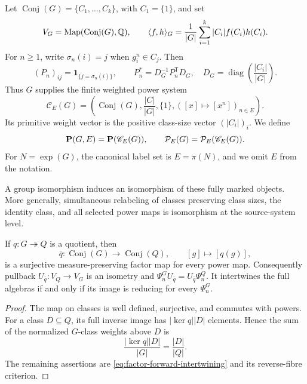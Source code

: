 Let
\(\operatorname{Conj}(G)=\{C_1,\ldots,C_k\}\), with
\(C_1=\{1\}\), and set
\begin{equation}
 V_G=\operatorname{Map}(\operatorname{Conj}(G),\mathbb Q),\qquad
 \langle f,h\rangle_G
 =\frac1{|G|}\sum_{i=1}^k |C_i|f(C_i)h(C_i).
 \label{eq:coordinate-class-form}
\end{equation}
For \(n\geq1\), write \(\sigma_n(i)=j\) when \(g_i^n\in C_j\).
Then
\begin{equation}
 (P_n)_{ij}=\mathbf1_{\{j=\sigma_n(i)\}},
 \qquad
 P_n^*=D_G^{-1}P_n^{\mathsf T}D_G,\quad
 D_G=\operatorname{diag}\left(\frac{|C_i|}{|G|}\right).
 \label{eq:power-matrix}
\end{equation}
Thus \(G\) supplies the finite weighted power system
\[
 \mathscr C_E(G)=
 \left(\operatorname{Conj}(G),\frac{|C|}{|G|},\{1\},
 ([x]\mapsto[x^n])_{n\in E}\right).
\]
Its primitive weight vector is the positive class-size vector
\((|C_i|)_i\).  We define
\begin{equation}
 \mathbf P(G,E)
 =\mathbf P(\mathscr C_E(G)),\qquad
 \mathcal P_E(G)
 =\mathcal P_E(\mathscr C_E(G)).
 \label{eq:ap-definition-structural}
\end{equation}
For \(N=\exp(G)\), the canonical label set is
\(E=\pi(N)\), and we omit \(E\) from the notation.

A group isomorphism induces an isomorphism of these fully marked objects.
More generally, simultaneous relabeling of classes preserving class sizes,
the identity class, and all selected power maps is isomorphism at
the source-system level.

\begin{proposition}
\label{prop:quotient-factor}
If \(q:G\twoheadrightarrow Q\) is a quotient, then
\[
 \bar q:\operatorname{Conj}(G)\longrightarrow\operatorname{Conj}(Q),
 \qquad [g]\longmapsto[q(g)],
\]
is a surjective measure-preserving factor map for every power map.
Consequently pullback \(U_{\bar q}:V_Q\to V_G\) is an isometry and
\(\Psi_n^GU_{\bar q}=U_{\bar q}\Psi_n^Q\).
It intertwines the full algebras if and only if its image
is reducing for every \(\Psi_n^G\).
\end{proposition}

\begin{proof}
The map on classes is well defined, surjective, and commutes with powers.
For a class \(D\subseteq Q\), its full inverse image has
\(|\ker q||D|\) elements.  Hence the sum of the normalized \(G\)-class
weights above \(D\) is
\[
 \frac{|\ker q||D|}{|G|}=\frac{|D|}{|Q|}.
\]
The remaining assertions are \eqref{eq:factor-forward-intertwining} and its
reverse-fibre criterion.
\end{proof}

